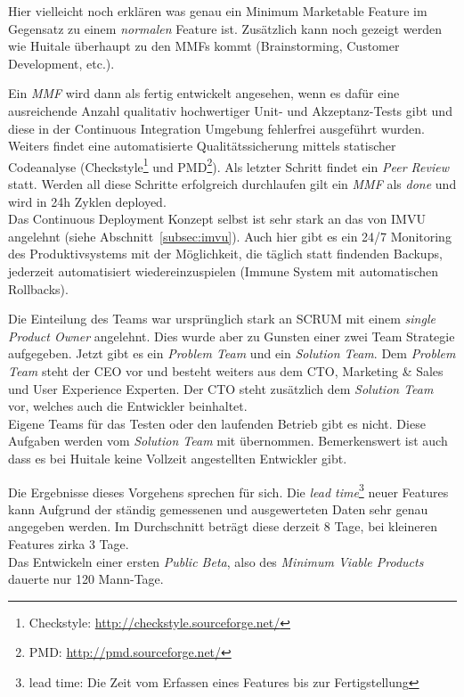\begin{wichtigbox}
Hier vielleicht noch erklären was genau ein Minimum Marketable Feature im
Gegensatz zu einem \emph{normalen} Feature ist. Zusätzlich kann noch gezeigt
werden wie Huitale überhaupt zu den MMFs kommt (Brainstorming, Customer
Development, etc.).
\end{wichtigbox}

Ein \emph{MMF} wird dann als fertig entwickelt angesehen, wenn es dafür eine
ausreichende Anzahl qualitativ hochwertiger Unit- und Akzeptanz-Tests gibt und
diese in der Continuous Integration Umgebung fehlerfrei ausgeführt wurden.
Weiters findet eine automatisierte Qualitätssicherung mittels statischer
Codeanalyse (Checkstyle\footnote{Checkstyle:
\url{http://checkstyle.sourceforge.net/}} und PMD\footnote{PMD:
\url{http://pmd.sourceforge.net/}}). Als letzter Schritt findet ein \emph{Peer
Review} statt. Werden all diese Schritte erfolgreich durchlaufen gilt ein
\emph{MMF} als \emph{done} und wird in 24h Zyklen deployed.\\
Das Continuous Deployment Konzept selbst ist sehr stark an das von IMVU
angelehnt (siehe Abschnitt~\ref{subsec:imvu}). Auch hier gibt es ein 24/7
Monitoring des Produktivsystems mit der Möglichkeit, die täglich statt
findenden Backups, jederzeit automatisiert wiedereinzuspielen (Immune System
mit automatischen Rollbacks).

Die Einteilung des Teams war ursprünglich stark an SCRUM mit einem
\emph{single Product Owner} angelehnt. Dies wurde aber zu Gunsten einer zwei
Team Strategie aufgegeben. Jetzt gibt es ein \emph{Problem Team} und ein
\emph{Solution Team}. Dem \emph{Problem Team} steht der CEO vor und besteht
weiters aus dem CTO, Marketing \& Sales und User Experience Experten. Der CTO
steht zusätzlich dem \emph{Solution Team} vor, welches auch die Entwickler
beinhaltet.\\
Eigene Teams für das Testen oder den laufenden Betrieb gibt es nicht. Diese
Aufgaben werden vom \emph{Solution Team} mit übernommen. Bemerkenswert ist auch
dass es bei Huitale keine Vollzeit angestellten Entwickler gibt.

Die Ergebnisse dieses Vorgehens sprechen für sich. Die \emph{lead
time}\footnote{lead time: Die Zeit vom Erfassen eines Features bis zur
Fertigstellung} neuer Features kann Aufgrund der ständig gemessenen und
ausgewerteten Daten sehr genau angegeben werden. Im Durchschnitt beträgt diese
derzeit 8 Tage, bei kleineren Features zirka 3 Tage.\\
Das Entwickeln einer ersten \emph{Public Beta}, also des \emph{Minimum Viable
Products} dauerte nur 120 Mann-Tage.

